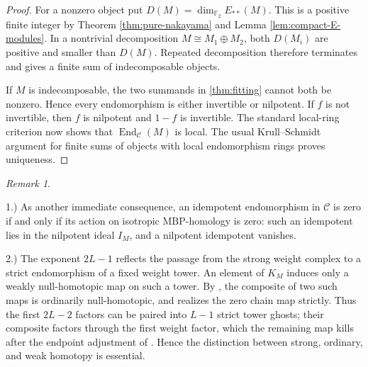 \documentclass[11pt]{amsart}
\numberwithin{equation}{section}
\theoremstyle{definition}
\theoremstyle{remark}
\newtheorem{remark}[theorem]{Remark}
\DeclareMathOperator{\End}{End}
\newcommand{\MBP}{\mathrm{MBP}}
\newcommand{\F}{\mathbb F_2}
\newcommand{\C}{\mathcal C}
\begin{document}
\begin{proof}
For a nonzero object put $D(M)=\dim_{\F}E_{**}(M)$.  This is a positive
finite integer by Theorem  \ref{thm:pure-nakayama} and Lemma \ref{lem:compact-E-modules}.  In a
nontrivial decomposition $M\cong M_1\oplus M_2$, both $D(M_i)$ are positive
and smaller than $D(M)$.  Repeated decomposition therefore terminates and
gives a finite sum of indecomposable objects.

If $M$ is indecomposable, the two summands in \cref{thm:fitting} cannot both
be nonzero.  Hence every endomorphism is either invertible or nilpotent.  If
$f$ is not invertible, then $f$ is nilpotent and $1-f$ is invertible.  The standard local-ring criterion now shows that
$\End_{\C}(M)$ is local.  The usual Krull--Schmidt argument for finite sums
of objects with local endomorphism rings proves uniqueness.
\end{proof}



\begin{remark}\label{rem:nilpotence-factor-two}

1.) As another immediate consequence, an idempotent endomorphism in $\C$ is zero
if and only if its action on isotropic $\MBP$-homology is zero: such an
idempotent lies in the nilpotent ideal $I_M$, and a nilpotent idempotent
vanishes.


2.) The exponent \(2L-1\) reflects the passage from the strong weight complex
to a strict endomorphism of a fixed weight tower. An element of \(K_M\)
induces only a weakly null-homotopic map on such a tower. By
\cite[Proposition~B.2(4)]{BondarkoWeightComplexes}, the composite of two
such maps is ordinarily null-homotopic, and
\cite[Proposition~1.3.4(13)]{BondarkoWeightComplexes} realizes the zero
chain map strictly. Thus the first \(2L-2\) factors can be paired into
\(L-1\) strict tower ghosts; their composite factors through the first weight
factor, which the remaining map kills after the endpoint adjustment of
\cite[Proposition~B.2(1),(2)]{BondarkoWeightComplexes}. Hence the distinction
between strong, ordinary, and weak homotopy is essential.
\end{remark}
\end{document}
